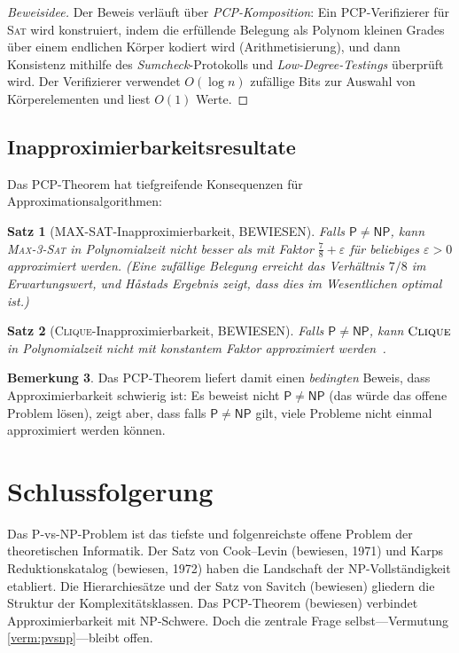 \documentclass[12pt,a4paper]{amsart}
\newtheorem{theorem}{Satz}[section]
\theoremstyle{definition}
\newtheorem{remark}[theorem]{Bemerkung}
\newcommand{\Pclass}{\mathsf{P}}
\newcommand{\NP}{\mathsf{NP}}
\newcommand{\SAT}{\textsc{Sat}}
\newcommand{\CLIQUE}{\textsc{Clique}}
\begin{document}
\begin{proof}[Beweisidee]
Der Beweis verläuft über \emph{PCP-Komposition}: Ein PCP-Verifizierer für
\SAT{} wird konstruiert, indem die erfüllende Belegung als Polynom kleinen
Grades über einem endlichen Körper kodiert wird (Arithmetisierung), und dann
Konsistenz mithilfe des \emph{Sumcheck}-Protokolls und
\emph{Low-Degree-Testings} überprüft wird.  Der Verifizierer verwendet
$O(\log n)$ zufällige Bits zur Auswahl von Körperelementen und liest $O(1)$
Werte.
\end{proof}

\subsection{Inapproximierbarkeitsresultate}

Das PCP-Theorem hat tiefgreifende Konsequenzen für Approximationsalgorithmen:

\begin{theorem}[MAX-SAT-Inapproximierbarkeit, BEWIESEN]
Falls $\Pclass\neq\NP$, kann \textsc{Max-3-Sat} in Polynomialzeit nicht
besser als mit Faktor $\frac{7}{8}+\varepsilon$ für beliebiges $\varepsilon>0$
approximiert werden.  (Eine zufällige Belegung erreicht das Verhältnis $7/8$ im Erwartungswert,
und H{\aa}stads Ergebnis zeigt, dass dies im Wesentlichen optimal ist.)
\end{theorem}

\begin{theorem}[\CLIQUE-Inapproximierbarkeit, BEWIESEN]
Falls $\Pclass\neq\NP$, kann $\CLIQUE$ in Polynomialzeit nicht mit konstantem
Faktor approximiert werden~\cite{hastad1999}.
\end{theorem}

\begin{remark}
Das PCP-Theorem liefert damit einen \emph{bedingten} Beweis, dass
Approximierbarkeit schwierig ist: Es beweist nicht $\Pclass\neq\NP$ (das würde
das offene Problem lösen), zeigt aber, dass falls $\Pclass\neq\NP$ gilt,
viele Probleme nicht einmal approximiert werden können.
\end{remark}

\section*{Schlussfolgerung}

Das P-vs-NP-Problem ist das tiefste und folgenreichste offene Problem der
theoretischen Informatik.  Der Satz von Cook--Levin (bewiesen, 1971) und Karps
Reduktionskatalog (bewiesen, 1972) haben die Landschaft der NP-Vollständigkeit
etabliert.  Die Hierarchiesätze und der Satz von Savitch (bewiesen) gliedern
die Struktur der Komplexitätsklassen.  Das PCP-Theorem (bewiesen) verbindet
Approximierbarkeit mit NP-Schwere.  Doch die zentrale Frage selbst---Vermutung
\ref{verm:pvsnp}---bleibt offen.
\end{document}
